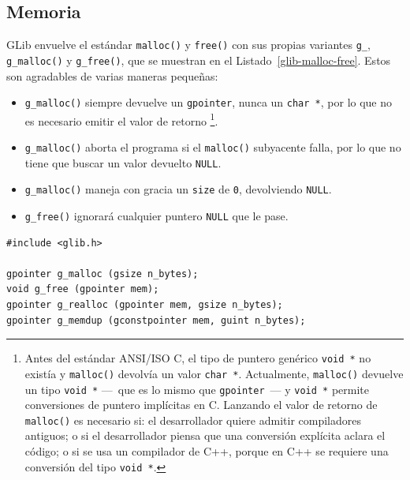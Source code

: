 \subsection{Memoria}

GLib envuelve el estándar \lstinline{malloc()} y \lstinline{free()} con sus propias variantes \lstinline{g_}, \lstinline{g_malloc()} y \lstinline{g_free()}, que se muestran en el Listado~\ref{glib-malloc-free}.
Estos son agradables de varias maneras pequeñas:

\begin{itemize}
    \item \lstinline{g_malloc()} siempre devuelve un \lstinline{gpointer}, nunca un \lstinline{char *}, por lo que no es necesario emitir el valor de retorno \footnote{Antes del estándar ANSI/ISO C, el tipo de puntero genérico \lstinline{void *} no existía y \lstinline{malloc()} devolvía un valor \lstinline{char *}. Actualmente, \lstinline{malloc()} devuelve un tipo \lstinline{void *} ---~que es lo mismo que \lstinline{gpointer}~--- y \lstinline{void *} permite conversiones de puntero implícitas en C. Lanzando el valor de retorno de \lstinline{malloc()} es necesario si: el desarrollador quiere admitir compiladores antiguos; o si el desarrollador piensa que una conversión explícita aclara el código; o si se usa un compilador de C++, porque en C++ se requiere una conversión del tipo \lstinline{void *}.}.
    
    \item \lstinline{g_malloc()} aborta el programa si el \lstinline{malloc()} subyacente falla, por lo que no tiene que buscar un valor devuelto \lstinline{NULL}.
    
    \item \lstinline{g_malloc()} maneja con gracia un \lstinline{size} de \lstinline{0}, devolviendo \lstinline{NULL}.
    
    \item \lstinline{g_free()} ignorará cualquier puntero \lstinline{NULL} que le pase.
\end{itemize}

\begin{lstlisting}[style=GLib/GTK, caption={Asignación de memoria GLib}, label=glib-malloc-free]
#include <glib.h>

gpointer g_malloc (gsize n_bytes);
void g_free (gpointer mem);
gpointer g_realloc (gpointer mem, gsize n_bytes);
gpointer g_memdup (gconstpointer mem, guint n_bytes);
\end{lstlisting}

